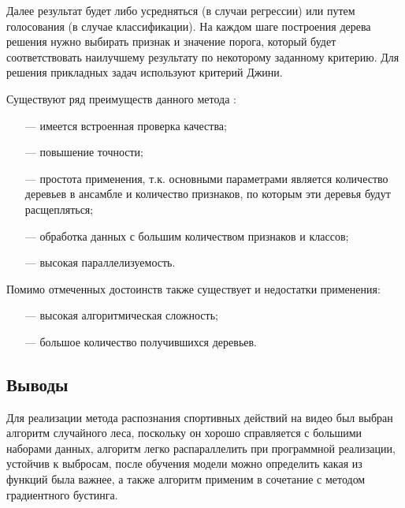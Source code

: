 Далее результат будет либо усредняться (в случаи регрессии) или путем
голосования (в случае классификации).
На каждом шаге построения дерева
решения нужно выбирать признак и
значение порога, который будет соответствовать наилучшему результату по
некоторому заданному критерию. Для
решения прикладных задач используют
критерий Джини.

Существуют ряд преимуществ данного метода \cite{randomForest}:
\begin{itemize}
	\item[---] имеется встроенная проверка качества;
	\item[---] повышение точности;
	\item[---] простота применения, т.к. основными параметрами является количество деревьев в ансамбле и количество
	признаков, по которым эти деревья будут расщепляться;
	\item[---] обработка данных с большим количеством признаков и классов;
	\item[---] высокая параллелизуемость.
\end{itemize}

Помимо отмеченных достоинств также существует и недостатки применения:
\begin{itemize}
	\item[---] 	высокая алгоритмическая сложность;
	\item[---] большое количество получившихся деревьев.
\end{itemize}


\subsection*{Выводы}
 Для реализации метода распознания спортивных действий на видео был выбран алгоритм случайного леса, поскольку он хорошо справляется с большими наборами данных, алгоритм легко распараллелить при программной реализации, устойчив к выбросам, после обучения модели можно определить какая из функций была важнее, а также алгоритм применим в сочетание с методом градиентного бустинга.

